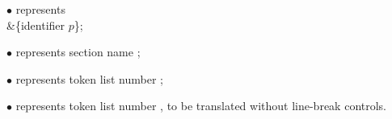 \item{$\bullet$} represents \.{\\\&\{{\rm identifier
$p$}\}};

\item{$\bullet$} represents section name ;

\item{$\bullet$} represents token list number ;

\item{$\bullet$} represents token list number %
, to be
translated without line-break controls.

